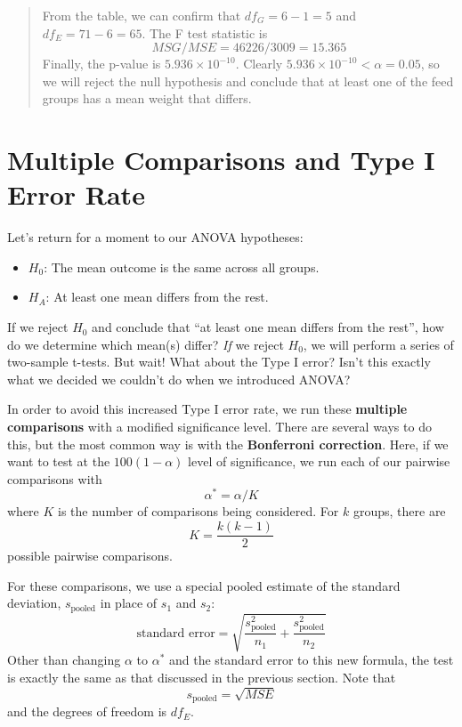 \documentclass[
]{book}
\providecommand{\tightlist}{%
  \setlength{\itemsep}{0pt}\setlength{\parskip}{0pt}}
\begin{document}
\begin{quote}
From the table, we can confirm that \(df_G = 6-1 = 5\) and \(df_E = 71 - 6 = 65\). The F test statistic is \[MSG/MSE = 46226 / 3009 = 15.365\] Finally, the p-value is \(5.936\times10^{-10}\). Clearly \(5.936\times10^{-10} < \alpha = 0.05\), so we will reject the null hypothesis and conclude that at least one of the feed groups has a mean weight that differs.
\end{quote}

\section{Multiple Comparisons and Type I Error Rate}\label{multiple-comparisons-and-type-i-error-rate}

Let's return for a moment to our ANOVA hypotheses:

\begin{itemize}
\tightlist
\item
  \(H_0\): The mean outcome is the same across all groups.
\item
  \(H_A\): At least one mean differs from the rest.
\end{itemize}

If we reject \(H_0\) and conclude that ``at least one mean differs from the rest'', how do we determine which mean(s) differ? \emph{If} we reject \(H_0\), we will perform a series of two-sample t-tests. But wait! What about the Type I error? Isn't this exactly what we decided we couldn't do when we introduced ANOVA?

In order to avoid this increased Type I error rate, we run these \textbf{multiple comparisons} with a modified significance level. There are several ways to do this, but the most common way is with the \textbf{Bonferroni correction}. Here, if we want to test at the \(100(1-\alpha)\) level of significance, we run each of our pairwise comparisons with \[\alpha^* = \alpha/K\] where \(K\) is the number of comparisons being considered. For \(k\) groups, there are \[K = \frac{k(k-1)}{2}\] possible pairwise comparisons.

For these comparisons, we use a special pooled estimate of the standard deviation, \(s_{\text{pooled}}\) in place of \(s_1\) and \(s_2\): \[\text{standard error} = \sqrt{\frac{s_{\text{pooled}}^2}{n_1} + \frac{s_{\text{pooled}}^2}{n_2}}\] Other than changing \(\alpha\) to \(\alpha^*\) and the standard error to this new formula, the test is exactly the same as that discussed in the previous section. Note that \[s_{\text{pooled}} = \sqrt{MSE}\] and the degrees of freedom is \(df_E\).
\end{document}
